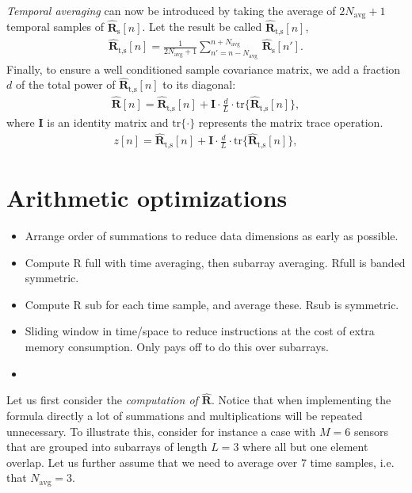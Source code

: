 \documentclass[12pt,journal,captionsoff,onecolumn]{IEEEtran}
\newcommand\tr{\text{tr}}
\newcommand\sumb[2]{\sum\limits_{#1}^{#2}\,}
\newcommand\mat[1]{\boldsymbol{#1}}
\newcommand\1{\vec 1}
\newcommand\I{\mat I}
\newcommand*\eR{\mat{\hat R}}
\begin{document}
\emph{Temporal averaging} can now be introduced by taking the average of $2N_\text{avg}+1$ temporal samples of $\eR_\text{s}[n]$. Let the result be called $\eR_\text{t,s}[n]$,
\begin{gather}
\eR_\text{t,s}[n] = \frac{1}{2N_\text{avg}+1} \sumb{n'=n-N_\text{avg}}{n+N_\text{avg}} \eR_\text{s}[n'].
\end{gather}
Finally, to ensure a well conditioned sample covariance matrix, we add a fraction $d$ of the total power of $\eR_\text{t,s}[n]$ to its diagonal\cite{Synnevag2007}:
\begin{align}
\eR[n] = \eR_\text{t,s}[n] + \I \cdot \frac{d}{L} \cdot \tr\{\eR_\text{t,s}[n]\},\label{finalR}
\end{align}
where $\I$ is an identity matrix and $\tr\{\cdot\}$ represents the matrix trace operation.
\begin{align}
z[n] = \eR_\text{t,s}[n] + \I \cdot \frac{d}{L} \cdot \tr\{\eR_\text{t,s}[n]\},\label{finalR}
\end{align}

\section{Arithmetic optimizations}


\begin{itemize}
\item Arrange order of summations to reduce data dimensions as early as possible.
\item Compute R full with time averaging, then subarray averaging. Rfull is banded symmetric.
\item Compute R sub for each time sample, and average these. Rsub is symmetric.
\item Sliding window in time/space to reduce instructions at the cost of extra memory consumption. Only pays off to do this over subarrays.
\item 
\end{itemize}



Let us first consider the \emph{computation of $\hat{\mat R}$}. Notice that when implementing the formula directly a lot of summations and multiplications will be repeated unnecessary. To illustrate this, consider for instance a case with $M=6$ sensors that are grouped into subarrays of length $L=3$ where all but one element overlap. Let us further assume that we need to average over 7 time samples, i.e. that $N_{\text{avg}} = 3$. 
\end{document}
